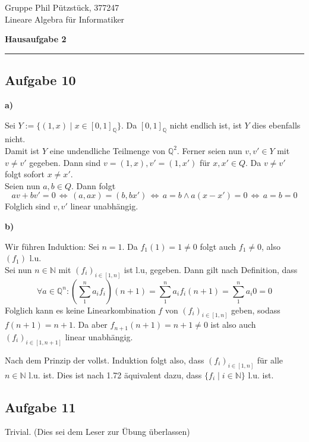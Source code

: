 \documentclass[a4paper,graphics,11pt]{article}
\newcommand{\aufgabe}[1]{\subsection*{Aufgabe #1}}
\begin{document}
\noindent Gruppe              \hfill Phil Pützstück, 377247\\
\noindent Lineare Algebra für Informatiker\\
\begin{center}
	\LARGE{\textbf{Hausaufgabe 2}}
\end{center}
\begin{center}
\rule[0.1ex]{\textwidth}{1pt}
\end{center}



\aufgabe{10}
\textbf{a)}

Sei $Y := \{(1,x) \mid x \in [0,1]_{\mathbb{Q}}\}$. Da $[0,1]_{\mathbb{Q}}$ nicht endlich ist, ist $Y$ dies ebenfalls nicht.\\
Damit ist $Y$ eine undendliche Teilmenge von $\mathbb{Q}^2$.
Ferner seien nun $v,v' \in Y$ mit $v \neq v'$ gegeben. Dann sind $v = (1,x), v' = (1,x')$ für $x,x' \in Q$.
Da $v \neq v'$ folgt sofort $x \neq x'$.\\
Seien nun $a,b \in Q$. Dann folgt
$$
    av+bv' = 0
    \,\Longleftrightarrow\, (a,ax) = (b,bx')
    \,\Longleftrightarrow\, a = b \land a(x-x') = 0
    \,\Longleftrightarrow\, a = b = 0
$$
Folglich sind $v,v'$ linear unabhängig.

\textbf{b)}

Wir führen Induktion:
Sei $n = 1$. Da $f_1(1) = 1 \neq 0$ folgt auch $f_1 \neq 0$, also $(f_1)$ l.u.\\
Sei nun $n \in \mathbb{N}$ mit $(f_i)_{i \in [1,n]}$ ist l.u, gegeben. Dann gilt nach Definition, dass
$$
    \forall a \in \mathbb{Q}^n : (\sum_{1}^{n} a_if_i)(n+1) = \sum_{1}^{n} a_if_i(n+1) = \sum_{1}^{n} a_i0 = 0
$$
Folglich kann es keine Linearkombination $f$ von $(f_i)_{i\in [1,n]}$ geben, sodass $f(n+1) = n+1$.
Da aber $f_{n+1}(n+1) = n+1 \neq 0$ ist also auch $(f_i)_{i \in [1,n+1]}$ linear unabhängig.

Nach dem Prinzip der vollst. Induktion folgt also, dass $(f_i)_{i \in [1,n]}$ für alle $n \in \mathbb{N}$ l.u. ist.
Dies ist nach 1.72 äquivalent dazu, dass $\{f_i \mid i \in \mathbb{N}\}$ l.u. ist.

\aufgabe{11}
Trivial. (Dies sei dem Leser zur Übung überlassen)
\end{document}
